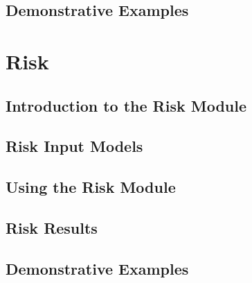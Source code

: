 \documentclass[11pt,fleqn]{book} %
\begin{document}
\chapter{Demonstrative Examples}
	\label{chap:hazdemos}
	
   \cleardoublepage

\thispagestyle{empty}
\part{Risk}

\chapter{Introduction to the Risk Module}
   \label{chap:riskintro}
	
   \cleardoublepage

\chapter{Risk Input Models}
   \label{chap:riskinputs}
   
   \cleardoublepage

\chapter{Using the Risk Module}
	\label{chap:riskcalculators}
	
   \cleardoublepage

\chapter{Risk Results}
	\label{chap:riskoutputs}
	
   \cleardoublepage

\chapter{Demonstrative Examples}
	\label{chap:riskdemos}
	
   \cleardoublepage


\end{document}
